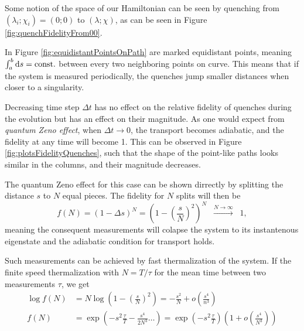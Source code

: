 Some notion of the space of our Hamiltonian can be seen by quenching from $(\lambda_i;\chi_i)=(0;0)$ to $(\lambda;\chi)$, as can be seen in Figure \ref{fig:quenchFidelityFrom00}.

In Figure \ref{fig:equidistantPointsOnPath} are marked equidistant points, meaning $\int_a^b \mathrm{d} s=\text{const.}$ between every two neighboring points on curve. This means that if the system is measured periodically, the quenches jump smaller distances when closer to a singularity.

Decreasing time step $\Delta t$ has no effect on the relative fidelity of quenches during the evolution but has an effect on their magnitude. As one would expect from \emph{quantum Zeno effect}, when $\Delta t\rightarrow 0$, the transport becomes adiabatic, and the fidelity at any time will become 1. This can be observed in Figure \ref{fig:plotsFidelityQuenches}, such that the shape of the point-like paths looks similar in the columns, and their magnitude decreases.

The quantum Zeno effect for this case can be shown dirrectly by splitting the distance $s$ to $N$ equal pieces. The fidelity for $N$ splits will then be
\begin{equation}
    f(N)=(1-\Delta s)^N=\left(1-\left(\frac{s}{N}\right)^2\right)^N \;\;\overset{N\rightarrow\infty}{\longrightarrow}\;\; 1,
\end{equation}
meaning the consequent measurements will colapse the system to its instantenous eigenstate and the adiabatic condition for transport holds. 

Such measurements can be achieved by fast thermalization of the system. If the finite speed thermalization with $N=T/\tau$ for the mean time between two measurements $\tau$, we get
\begin{equation}
    \begin{split}
        \log f(N) &= N \log \left(1-\left(\frac{s}{N}\right)^2\right) = -\frac{s^2}{N}+o\left(\frac{s^4}{n^3}\right)\\
        f(N) &= \exp\left(-s^2\frac{\tau}{T}-\frac{s^4}{2 N^3}\dots\right) = \exp\left(-s^2\frac{\tau}{T}\right)\left(1+o\left(\frac{s^4}{N^3}\right)\right)
    \end{split}
\end{equation}


